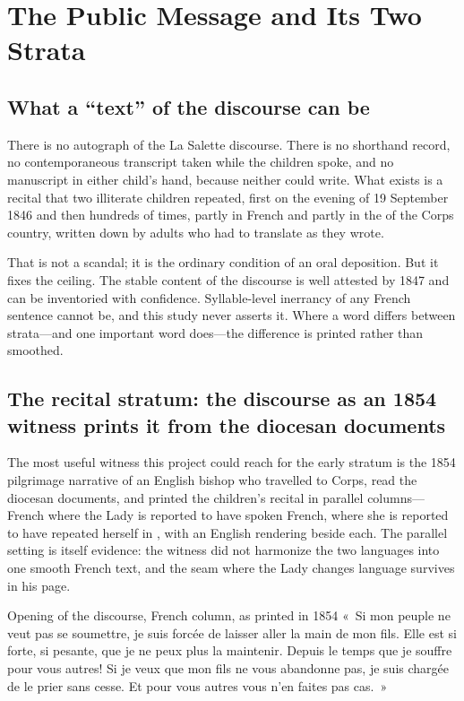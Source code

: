 \section{The Public Message and Its Two Strata}

\subsection{What a ``text'' of the discourse can be}

There is no autograph of the La Salette discourse. There is no
shorthand record, no contemporaneous transcript taken while the
children spoke, and no manuscript in either child's hand, because
neither could write. What exists is a recital that two illiterate
children repeated, first on the evening of 19 September 1846 and
then hundreds of times, partly in French and partly in the
 of the Corps country, written down by adults who had
to translate as they wrote.

That is not a scandal; it is the ordinary condition of an oral
deposition. But it fixes the ceiling. The stable content of the
discourse is well attested by 1847 and can be inventoried with
confidence. Syllable-level inerrancy of any French sentence cannot
be, and this study never asserts it. Where a word differs between
strata---and one important word does---the difference is printed
rather than smoothed.

\subsection{The recital stratum: the discourse as an 1854 witness
prints it from the diocesan documents}

The most useful witness this project could reach for the early
stratum is the 1854 pilgrimage narrative of an English bishop who
travelled to Corps, read the diocesan documents, and printed the
children's recital in parallel columns---French where the Lady is
reported to have spoken French,  where she is reported
to have repeated herself in , with an English rendering
beside each. The parallel setting is itself evidence: the witness
did not harmonize the two languages into one smooth French text, and
the seam where the Lady changes language survives in his page.

\begin{witnesstext}{Opening of the discourse, French column, as
printed in 1854}
«~Si mon peuple ne veut pas se soumettre, je suis forcée de laisser
aller la main de mon fils. Elle est si forte, si pesante, que je ne
peux plus la maintenir. Depuis le temps que je souffre pour vous
autres! Si je veux que mon fils ne vous abandonne pas, je suis
chargée de le prier sans cesse. Et pour vous autres vous n'en faites
pas cas.~»
\end{witnesstext}

